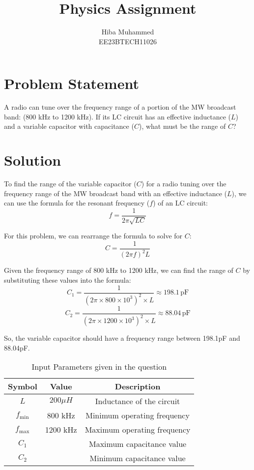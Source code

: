 \documentclass[12pt]{article}
\title{Physics Assignment}
\author{Hiba Muhammed \\
          EE23BTECH11026}
\begin{document}
    \maketitle

    \section*{Problem Statement}
    A radio can tune over the frequency range of a portion of the MW broadcast band: (800 kHz to 1200 kHz). If its LC circuit has an effective inductance (\(L\)) and a variable capacitor with capacitance (\(C\)), what must be the range of \(C\)?

    \section*{Solution}
    To find the range of the variable capacitor (\(C\)) for a radio tuning over the frequency range of the MW broadcast band with an effective inductance (\(L\)), we can use the formula for the resonant frequency (\(f\)) of an LC circuit:
    \[ f = \frac{1}{2\pi\sqrt{LC}} \]

    For this problem, we can rearrange the formula to solve for \(C\):
    \[ C = \frac{1}{(2\pi f)^2L} \]

    Given the frequency range of 800 kHz to 1200 kHz, we can find the range of \(C\) by substituting these values into the formula:
    \[ C_1 = \frac{1}{(2\pi \times 800 \times 10^3)^2 \times L} \approx 198.1 \, \text{pF} \]
    \[ C_2 = \frac{1}{(2\pi \times 1200 \times 10^3)^2 \times L} \approx 88.04 \, \text{pF} \]

    So, the variable capacitor should have a frequency range between 198.1pF and 88.04pF.

\begin{table}[h]
  \centering
  \caption{Input Parameters given in the question}
  \label{tab:parameters}
  \begin{tabular}{|c|c|c|}
    \hline
    \textbf{Symbol} & \textbf{Value} & \textbf{Description} \\
    \hline
    \(L\) & \(200 \mu H\) & Inductance of the circuit \\
    \hline
    \(f_{\text{min}}\) & 800 kHz & Minimum operating frequency \\
    \hline
    \(f_{\text{max}}\) & 1200 kHz & Maximum operating frequency \\
    \hline
    \(C_1\) &   & Maximum capacitance value \\
    \hline
    \(C_2\) &  & Minimum capacitance value \\
    \hline
  \end{tabular}
\end{table}
\end{document}
